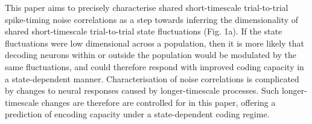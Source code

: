 \documentclass{article}
\begin{document}
This paper aims to precisely characterise shared short-timescale trial-to-trial spike-timing noise correlations as a step towards inferring the dimensionality of shared short-timescale trial-to-trial state fluctuations (Fig. 1a). If the state fluctuations were low dimensional across a population, then it is more likely that decoding neurons within or outside the population would be modulated by the same fluctuations, and could therefore respond with improved coding capacity in a state-dependent manner.
Characterisation of noise correlations is complicated by changes to neural responses caused by longer-timescale processes. Such longer-timescale changes are therefore are controlled for in this paper, offering a prediction of encoding capacity under a state-dependent coding regime.










\end{document}
